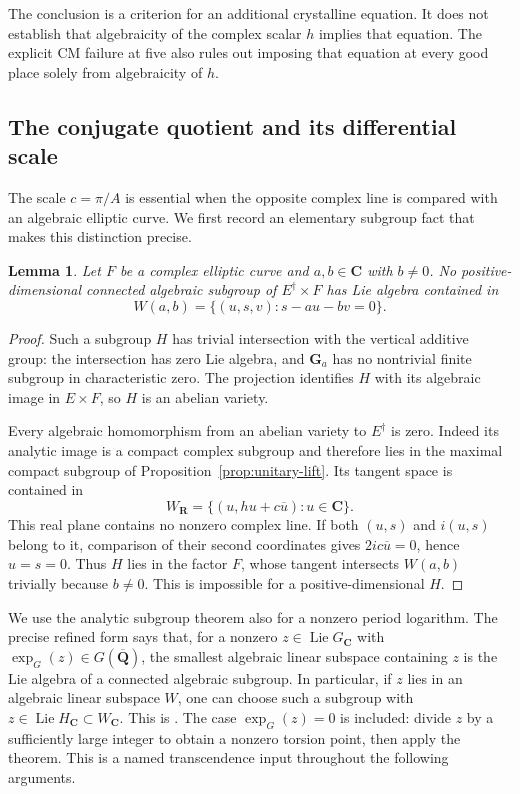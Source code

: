\documentclass[11pt]{article}
\newtheorem{lemma}[theorem]{Lemma}
\theoremstyle{definition}\newtheorem{definition}[theorem]{Definition}
\theoremstyle{remark}\newtheorem{remark}[theorem]{Remark}
\newcommand{\R}{\mathbf R}\newcommand{\C}{\mathbf C}
\newcommand{\Qb}{\overline{\mathbf Q}}\newcommand{\Fp}{\mathbf F_p}
\DeclareMathOperator{\Lie}{Lie}\DeclareMathOperator{\trdeg}{trdeg}
\begin{document}
The conclusion is a criterion for an additional crystalline equation. It does not establish that algebraicity of the complex scalar $h$ implies that equation. The explicit CM failure at five also rules out imposing that equation at every good place solely from algebraicity of $h$.

\subsection{The conjugate quotient and its differential scale}
The scale $c=\pi/A$ is essential when the opposite complex line is compared with an algebraic elliptic curve. We first record an elementary subgroup fact that makes this distinction precise.

\begin{lemma}\label{lem:no-graph-subgroup}
Let $F$ be a complex elliptic curve and $a,b\in\C$ with $b\ne0$. No positive-dimensional connected algebraic subgroup of $E^\dagger\times F$ has Lie algebra contained in
\[
             W(a,b)=\{(u,s,v):s-au-bv=0\}.
\]
\end{lemma}
\begin{proof}
Such a subgroup $H$ has trivial intersection with the vertical additive group: the intersection has zero Lie algebra, and $\mathbf G_a$ has no nontrivial finite subgroup in characteristic zero. The projection identifies $H$ with its algebraic image in $E\times F$, so $H$ is an abelian variety.

Every algebraic homomorphism from an abelian variety to $E^\dagger$ is zero. Indeed its analytic image is a compact complex subgroup and therefore lies in the maximal compact subgroup of Proposition~\ref{prop:unitary-lift}. Its tangent space is contained in
\[
                 W_{\R}=\{(u,hu+c\overline u):u\in\C\}.
\]
This real plane contains no nonzero complex line. If both $(u,s)$ and $i(u,s)$ belong to it, comparison of their second coordinates gives $2ic\overline u=0$, hence $u=s=0$. Thus $H$ lies in the factor $F$, whose tangent intersects $W(a,b)$ trivially because $b\ne0$. This is impossible for a positive-dimensional $H$.
\end{proof}

We use the analytic subgroup theorem also for a nonzero period logarithm. The precise refined form says that, for a nonzero $z\in\Lie G_{\C}$ with $\exp_G(z)\in G(\Qb)$, the smallest algebraic linear subspace containing $z$ is the Lie algebra of a connected algebraic subgroup. In particular, if $z$ lies in an algebraic linear subspace $W$, one can choose such a subgroup with $z\in\Lie H_{\C}\subset W_{\C}$. This is \cite[Theorem 6.2, printed pp.~43--44, PDF pp.~59--60]{HuberWustholz}. The case $\exp_G(z)=0$ is included: divide $z$ by a sufficiently large integer to obtain a nonzero torsion point, then apply the theorem. This is a named transcendence input throughout the following arguments.
\end{document}
